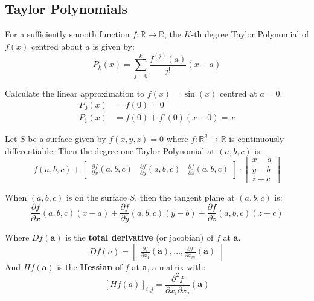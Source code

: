 \documentclass[a4paper]{article}
\newcommand{\RR}{\mathbb{R}}
\def\pp#1#2{\frac{\partial #1}{\partial #2}}
\newenvironment{definition}[1][Definition.]{\begin{trivlist}
\item[\hskip \labelsep {\bfseries #1}]}{\end{trivlist}}
\newenvironment{example}[1][Example.]{\begin{trivlist}
\item[\hskip \labelsep {\bfseries #1}]}{\end{trivlist}}
\begin{document}
\begin{multicols}{2}
	\section*{Taylor Polynomials}
	\begin{definition}
		For a sufficiently smooth function $f:\RR\to\RR$, the $K$-th degree Taylor Polynomial of $f(x)$ centred about $a$ is given by:
		$$P_k(x)=\sum_{j=0}^{k}\frac{f^{(j)}(a)}{j!}(x-a)$$
	\end{definition}

	\begin{example}
		Calculate the linear approximation to $f(x)=\sin(x)$ centred at $a=0$.
		\begin{align*}
			P_0(x) & =f(0)=0            \\
			P_1(x) & =f(0)+f'(0)(x-0)=x
		\end{align*}
	\end{example}

	\begin{definition}
		Let $S$ be a surface given by $f(x,y,z)=0$ where $f:\RR^3\to\RR$ is continuously differentiable. Then the degree one Taylor Polynomial at $(a,b,c)$ is:
		$$
			f(a,b,c)+\begin{bmatrix}
				\frac{\partial f}{ \partial x}(a,b,c) &
				\frac{\partial f}{ \partial y}(a,b,c) &
				\frac{\partial f}{ \partial z}(a,b,c)
			\end{bmatrix} \cdot \begin{bmatrix}
				x-a \\ y-b \\ z-c
			\end{bmatrix}
		$$

		When $(a,b,c)$ is on the surface $S$, then the tangent plane at $(a,b,c)$ is:
		$$
			\frac{\partial f}{ \partial x}(a,b,c)(x-a) +
			\frac{\partial f}{ \partial y}(a,b,c)(y-b) +
			\frac{\partial f}{ \partial z}(a,b,c)(z-c)
		$$

		Where $Df(\mathbf{a})$ is the \textbf{total derivative} (or jacobian) of $f$ at $\textbf{a}$.
		\[
			Df(a)=\begin{bmatrix}
				\pp f{x_1}(\textbf{a}),\dots,\pp f{x_m}(\textbf{a})
			\end{bmatrix}
		\]
		And $Hf(\textbf{a})$ is the \textbf{Hessian} of $f$ at \textbf{a}, a matrix with:
		\[
			[Hf(a)]_{i,j} = \frac{\partial^2f}{\partial x_i \partial x_j}(\textbf{a})
		\]


	\end{definition}


\end{multicols}
\end{document}
